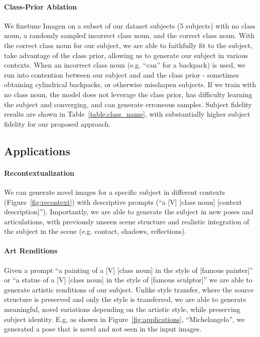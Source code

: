 \paragraph{Class-Prior Ablation}
We finetune Imagen on a subset of our dataset subjects (5 subjects) with no class noun, a randomly sampled incorrect class noun, and the correct class noun. With the correct class noun for our subject, we are able to faithfully fit to the subject, take advantage of the class prior, allowing us to generate our subject in various contexts. When an incorrect class noun (e.g. ``can'' for a backpack) is used, we run into contention between our subject and and the class prior - sometimes obtaining cylindrical backpacks, or otherwise misshapen subjects. If we train with no class noun, the model does not leverage the class prior, has difficulty learning the subject and converging, and can generate erroneous samples. Subject fidelity results are shown in Table~\ref{table:class_name}, with substantially higher subject fidelity for our proposed approach.

\subsection{Applications}

\paragraph{Recontextualization}
We can generate novel images for a specific subject in different contexts (Figure~\ref{fig:recontext}) with descriptive prompts (``a [V] [class noun] [context description]''). Importantly, we are able to generate the subject in new poses and articulations, with previously unseen scene structure and realistic integration of the subject in the scene (e.g. contact, shadows, reflections). 

\vspace{-0.2cm}

\paragraph{Art Renditions}
Given a prompt ``a painting of a [V] [class noun] in the style of [famous painter]'' or ``a statue of a [V] [class noun] in the style of [famous sculptor]'' we are able to generate artistic renditions of our subject. Unlike style transfer, where the source structure is preserved and only the style is transferred, we are able to generate meaningful, novel variations depending on the artistic style, while preserving subject identity. E.g, as shown in Figure~\ref{fig:applications}, ``Michelangelo'', we generated a pose that is novel and not seen in the input images.

